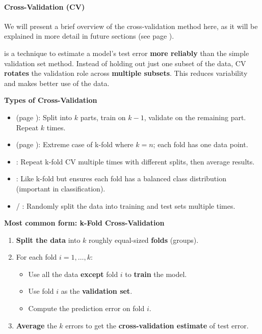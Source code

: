 \paragraph{Cross-Validation (CV)}\label{paragraph: Cross-Validation}

We will present a brief overview of the cross-validation method here, as it will be explained in more detail in future sections (see page \pageref{section: Cross-Validation}).

\highspace
{} is a technique to estimate a model's test error \textbf{more reliably} than the simple validation set method. Instead of holding out just one subset of the data, CV \textbf{rotates} the validation role across \textbf{multiple subsets}. This reduces variability and makes better use of the data.

\highspace
\begin{flushleft}
    \textcolor{Green3}{ \textbf{Types of Cross-Validation}}
\end{flushleft}
\begin{itemize}
    \item {} (page \pageref{subsubsection: K-Fold Cross-Validation}): Split into $k$ parts, train on $k - 1$, validate on the remaining part. Repeat $k$ times.
    \item {} (page \pageref{subsubsection: Leave-One-Out CV - LOOCV}): Extreme case of k-fold where $k = n$; each fold has one data point.
    \item {}: Repeat k-fold CV multiple times with different splits, then average results.
    \item {}: Like k-fold but ensures each fold has a balanced class distribution (important in classification).
    \item {} / : Randomly split the data into training and test sets multiple times.
\end{itemize}

\highspace
\begin{flushleft}
    \textcolor{Green3}{ \textbf{Most common form: k-Fold Cross-Validation}}
\end{flushleft}
\begin{enumerate}
    \item \textbf{Split the data} into $k$ roughly equal-sized \textbf{folds} (groups).
    \item For each fold $i = 1, \dots, k$:
    \begin{itemize}
        \item Use all the data \textbf{except} fold $i$ to \textbf{train} the model.
        \item Use fold $i$ as the \textbf{validation set}.
        \item Compute the prediction error on fold $i$.
    \end{itemize}
    \item \textbf{Average} the $k$ errors to get the \textbf{cross-validation estimate} of test error.
\end{enumerate}


